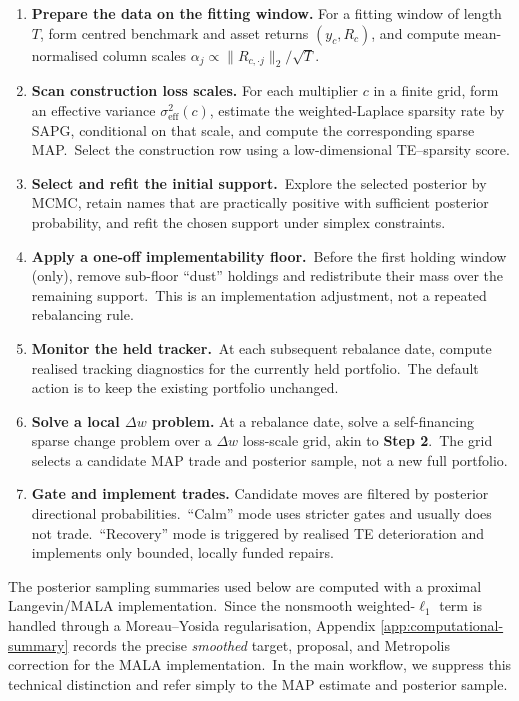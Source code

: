 \documentclass[11pt]{article}
\begin{document}
\begin{enumerate}[label=\textbf{Step \arabic*.}, leftmargin=2.2cm]
  \item \textbf{Prepare the data on the fitting window.} For a fitting window of length $T$, form centred benchmark and asset returns \((y_c,R_c)\), and compute mean-normalised column scales \(\alpha_j\propto\|R_{c,\cdot j}\|_2/\sqrt{T}\).

  \item \textbf{Scan construction loss scales.} For each multiplier \(c\) in a finite grid, form an effective variance \(\sigma^2_{\mathrm{eff}}(c)\), estimate the weighted-Laplace sparsity rate by SAPG, conditional on that scale, and compute the corresponding sparse MAP.\ Select the construction row using a low-dimensional TE--sparsity score.

  \item \textbf{Select and refit the initial support.}\ Explore the selected posterior by MCMC, retain names that are practically positive with sufficient posterior probability, and refit the chosen support under simplex constraints.

  \item \textbf{Apply a one-off implementability floor.}\ Before the first holding window (only), remove sub-floor ``dust'' holdings and redistribute their mass over the remaining support.\ This is an implementation adjustment, not a repeated rebalancing rule.

  \item \textbf{Monitor the held tracker.}\ At each subsequent rebalance date, compute realised tracking diagnostics for the currently held portfolio.\ The default action is to keep the existing portfolio unchanged.

  \item \textbf{Solve a local \(\Delta w\) problem.}  At a rebalance date, solve a self-financing sparse change problem over a \(\Delta w\) loss-scale grid, akin to {\bf Step 2}.\ The grid selects a candidate MAP trade and posterior sample, not a new full portfolio.

  \item \textbf{Gate and implement trades.}  Candidate moves are filtered by posterior directional probabilities.\ ``Calm'' mode uses stricter gates and usually does not trade.\ ``Recovery'' mode is triggered by realised TE deterioration and implements only bounded, locally funded repairs.
\end{enumerate}

The posterior sampling summaries used below are computed with a proximal Langevin/MALA implementation.\ Since the nonsmooth weighted-$\ell_1$ term is handled through a Moreau--Yosida regularisation, Appendix \ref{app:computational-summary} records the precise \emph{smoothed} target, proposal, and Metropolis correction for the MALA implementation.\ In the main workflow, we suppress this technical distinction and refer simply to the MAP estimate and posterior sample. 
\end{document}
